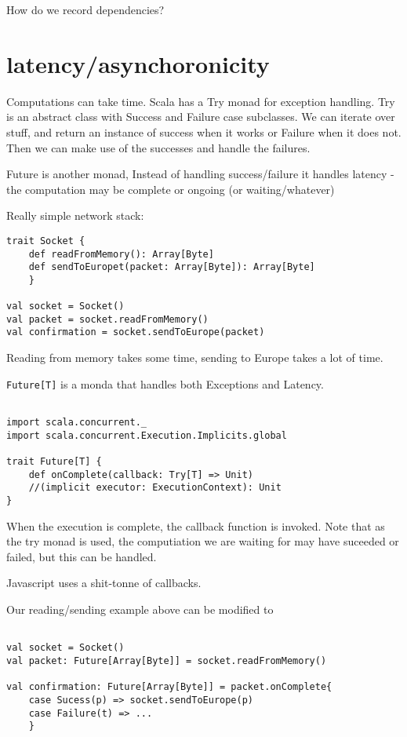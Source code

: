 How do we record dependencies?

\section{latency/asynchoronicity}
Computations can take time. 
Scala has a Try monad for exception handling. Try is an abstract class with Success and Failure case subclasses. We can iterate over stuff, and return an instance of success when it works or Failure when it does not. Then we can make use of the successes and handle the failures.

Future is another monad, Instead of handling success/failure it handles latency - the computation may be complete or ongoing (or waiting/whatever)

Really simple network stack:
\begin{lstlisting}
trait Socket {
	def readFromMemory(): Array[Byte]
	def sendToEuropet(packet: Array[Byte]): Array[Byte]
	}

val socket = Socket()
val packet = socket.readFromMemory()
val confirmation = socket.sendToEurope(packet)

\end{lstlisting}
Reading from memory takes some time, sending to Europe takes a lot of time.

\lstinline{Future[T]} is a monda that handles both Exceptions and Latency.

\begin{lstlisting}

import scala.concurrent._
import scala.concurrent.Execution.Implicits.global

trait Future[T] {
	def onComplete(callback: Try[T] => Unit)
	//(implicit executor: ExecutionContext): Unit
}
\end{lstlisting}

When the execution is complete, the callback function is invoked. Note that as the try monad is used, the computiation we are waiting for may have suceeded or failed, but this can be handled.

Javascript uses a shit-tonne of callbacks.

Our reading/sending example above can be modified to 
\begin{lstlisting}

val socket = Socket()
val packet: Future[Array[Byte]] = socket.readFromMemory()

val confirmation: Future[Array[Byte]] = packet.onComplete{
	case Sucess(p) => socket.sendToEurope(p)
	case Failure(t) => ...
	}
\end{lstlisting}

